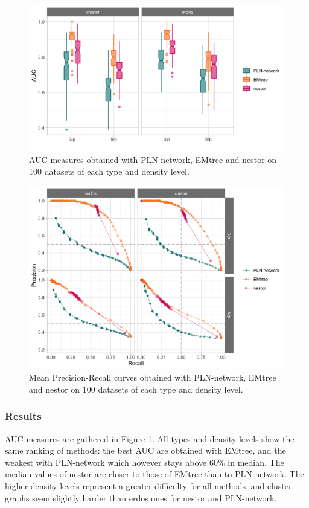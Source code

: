 \begin{subappendices}
 

\begin{figure}[tp]
\centering
\includegraphics[width=12cm]{figs/AUC_PLN_EM_VEM.png}
\caption{AUC measures obtained with PLN-network, EMtree and nestor on 100 datasets of each type and density level.}
\label{compar:auc}
\end{figure}
\begin{figure}[H]
\centering
\includegraphics[width=12cm]{figs/precrec_PLN_EM_VEM.png}
\caption{Mean Precision-Recall curves obtained with PLN-network, EMtree and nestor on 100 datasets of each type and density level.}
\label{compar:precrec}
\end{figure}
\subsubsection*{Results}
AUC measures are gathered in Figure \ref{compar:auc}. All types and density levels show the same ranking of methods: the best AUC are obtained with EMtree, and the weakest with PLN-network which however stays above $60\%$ in median. The median values of nestor are closer to those of EMtree than to PLN-network. The higher density levels represent a greater difficulty for all methods, and cluster graphs seem slightly harder than erdos ones for nestor and PLN-network.\\


\end{subappendices}
